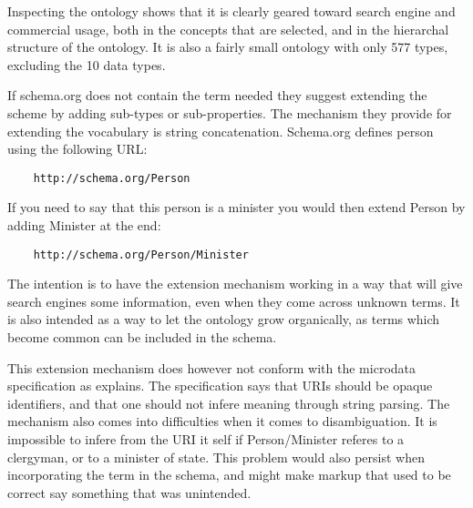 
Inspecting the ontology shows that it is clearly geared toward search engine and commercial usage,
both in the concepts that are selected, and in the hierarchal structure of the ontology\citep{Ronallo2012}.
It is also a fairly small ontology with only 577 types, excluding the 10 data types.

If schema.org does not contain the term needed they suggest extending the scheme by adding sub-types or sub-properties.
The mechanism they provide for extending the vocabulary is string concatenation.
Schema.org defines person using the following URL:
\begin{verbatim}
	http://schema.org/Person
\end{verbatim}
If you need to say that this person is a minister you would then extend Person by adding Minister at the end:
\begin{verbatim}
	http://schema.org/Person/Minister
\end{verbatim}
The intention is to have the extension mechanism working in a way that will give search engines some information,
even when they come across unknown terms.
It is also intended as a way to let the ontology grow organically,
as terms which become common can be included in the schema.

This extension mechanism does however not conform with the microdata specification as \citet{Tennison2011} explains.
The specification says that URIs should be opaque identifiers,
and that one should not infere meaning through string parsing.
The mechanism also comes into difficulties when it comes to disambiguation.
It is impossible to infere from the URI it self if Person/Minister referes to a clergyman, or to a minister of state.
This problem would also persist when incorporating the term in the schema,
and might make markup that used to be correct say something that was unintended.

